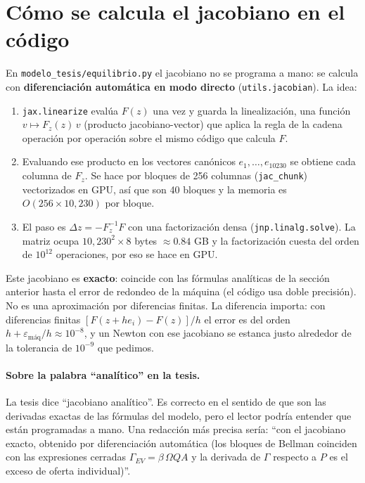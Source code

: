 \documentclass{article}
\begin{document}
\section{Cómo se calcula el jacobiano en el código}

En \texttt{modelo\_tesis/equilibrio.py} el jacobiano no se programa a mano: se calcula con
\textbf{diferenciación automática en modo directo} (\texttt{utils.jacobian}). La idea:
\begin{enumerate}
  \item \texttt{jax.linearize} evalúa $F(z)$ una vez y guarda la linealización, una función
  $v\mapsto F_z(z)\,v$ (producto jacobiano-vector) que aplica la regla de la cadena operación por
  operación sobre el mismo código que calcula $F$.
  \item Evaluando ese producto en los vectores canónicos $e_1,\dots,e_{10230}$ se obtiene cada
  columna de $F_z$. Se hace por bloques de 256 columnas (\texttt{jac\_chunk}) vectorizados en GPU,
  así que son 40 bloques y la memoria es $O(256\times10{,}230)$ por bloque.
  \item El paso es $\Delta z=-F_z^{-1}F$ con una factorización densa
  (\texttt{jnp.linalg.solve}). La matriz ocupa $10{,}230^2\times8$ bytes $\approx 0.84$ GB y la factorización cuesta
  del orden de $10^{12}$ operaciones, por eso se hace en GPU.
\end{enumerate}
Este jacobiano es \textbf{exacto}: coincide con las fórmulas analíticas de la sección anterior hasta
el error de redondeo de la máquina (el código usa doble precisión). No es una aproximación por
diferencias finitas. La diferencia importa: con diferencias finitas
$[F(z+he_i)-F(z)]/h$ el error es del orden $h+\varepsilon_{\text{máq}}/h\approx10^{-8}$, y un Newton
con ese jacobiano se estanca justo alrededor de la tolerancia de $10^{-9}$ que pedimos.

\paragraph{Sobre la palabra ``analítico'' en la tesis.} La tesis dice ``jacobiano analítico''. Es
correcto en el sentido de que son las derivadas exactas de las fórmulas del modelo, pero el lector
podría entender que están programadas a mano. Una redacción más precisa sería: ``con el jacobiano
exacto, obtenido por diferenciación automática (los bloques de Bellman coinciden con las expresiones
cerradas $\Gamma_{EV}=\beta\,\Omega QA$ y la derivada de $\Gamma$ respecto a $P$ es el exceso de oferta
individual)''.
\end{document}
